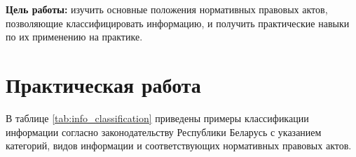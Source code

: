 \documentclass{bsuir}
\begin{document}
\maketitle
\mainmatter

\textbf{Цель работы:} изучить основные положения нормативных правовых
актов, позволяющие классифицировать информацию, и получить практические
навыки по их применению на практике.

\section{Практическая работа}

В таблице \ref{tab:info_classification} приведены примеры классификации
информации согласно законодательству Республики Беларусь с указанием категорий,
видов информации и соответствующих нормативных правовых актов.
\end{document}
